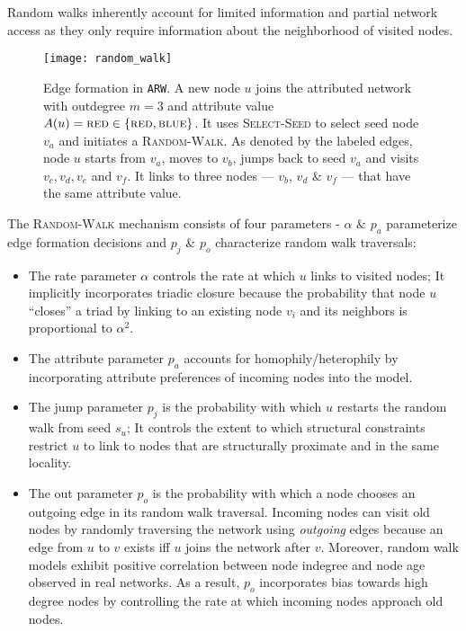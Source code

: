 Random walks inherently account for limited information and partial network access as
they only require information about the neighborhood of visited nodes.
\begin{figure}[h]
    \centering
    \texttt{[image: random\_walk]}
    \vspace{3mm}
    \caption{Edge formation in \texttt{ARW}.
    A new node $u$ joins the attributed network with outdegree ${m=3}$ and attribute value
    {$A(u)=\textsc{red} \in \{\textsc{red},\textsc{blue}\}$}.
    It uses \textsc{Select-Seed} to select seed node $v_a$ and initiates a \textsc{Random-Walk}.
    As denoted by the labeled edges, node $u$ starts from $v_a$, moves to $v_b$, jumps back to seed $v_a$ and
    visits $v_c, v_d, v_e$ and $v_f$. It links to three nodes ---  $v_b$, $v_d$ \& $v_f$ ---
    that have the same attribute value.}
    \label{fig:randomwalk}
    \vspace{-2mm}
\end{figure}

The \textsc{Random-Walk}
mechanism consists of four parameters - $\alpha$ \& $p_a$
parameterize edge formation decisions and $p_j$ \& $p_o$ characterize random walk
traversals:
\begin{itemize}
    \item The rate parameter $\alpha$ controls the rate at which $u$ links to
    visited nodes; It implicitly incorporates triadic closure because the
    probability that node $u$ ``closes'' a triad by linking to an existing node
    $v_i$ and its neighbors is proportional to $\alpha^2$.

    \item The attribute parameter $p_a$ accounts
    for homophily/heterophily by incorporating attribute preferences of incoming nodes
    into the model.

    \item The jump parameter $p_j$ is the probability with which $u$ restarts the
    random walk from seed $s_u$; It controls the extent to which structural constraints restrict $u$ to link to nodes that are
    structurally proximate and in the same locality.

    \item The out parameter $p_o$ is the probability with which a node chooses an
    outgoing edge in its random walk traversal. Incoming nodes can visit old nodes
    by randomly traversing the network using \textit{outgoing} edges because an
    edge from $u$ to $v$ exists iff $u$ joins the network after $v$. Moreover,
    random walk models \cite{vazquez2000knowing} exhibit positive correlation between node
    indegree and node age observed in real networks.
    As a result, $p_o$ incorporates bias towards high
    degree nodes by controlling the rate at which incoming nodes approach old nodes.
\end{itemize}

